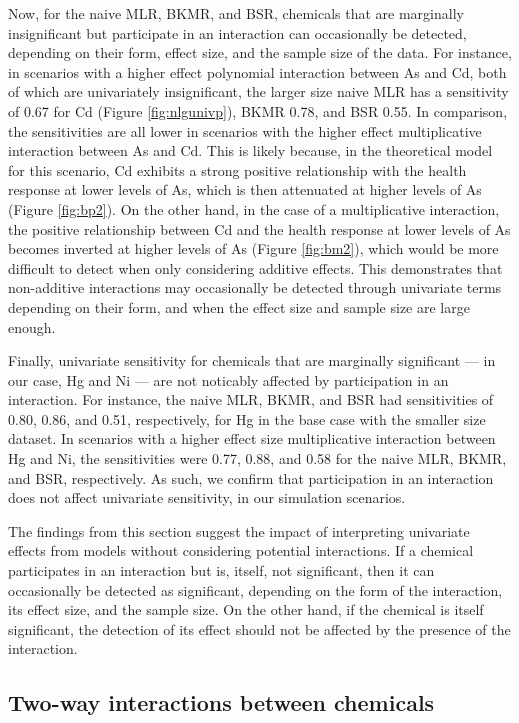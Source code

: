 \documentclass[12pt, twoside]{amherstthesis}
\begin{document}
Now, for the naive MLR, BKMR, and BSR, chemicals that are marginally insignificant but participate in an interaction can occasionally be detected, depending on their form, effect size, and the sample size of the data. For instance, in scenarios with a higher effect polynomial interaction between As and Cd, both of which are univariately insignificant, the larger size naive MLR has a sensitivity of 0.67 for Cd (Figure \ref{fig:nlgunivp}), BKMR 0.78, and BSR 0.55. In comparison, the sensitivities are all lower in scenarios with the higher effect multiplicative interaction between As and Cd. This is likely because, in the theoretical model for this scenario, Cd exhibits a strong positive relationship with the health response at lower levels of As, which is then attenuated at higher levels of As (Figure \ref{fig:bp2}). On the other hand, in the case of a multiplicative interaction, the positive relationship between Cd and the health response at lower levels of As becomes inverted at higher levels of As (Figure \ref{fig:bm2}), which would be more difficult to detect when only considering additive effects. This demonstrates that non-additive interactions may occasionally be detected through univariate terms depending on their form, and when the effect size and sample size are large enough.

Finally, univariate sensitivity for chemicals that are marginally significant --- in our case, Hg and Ni --- are not noticably affected by participation in an interaction. For instance, the naive MLR, BKMR, and BSR had sensitivities of 0.80, 0.86, and 0.51, respectively, for Hg in the base case with the smaller size dataset. In scenarios with a higher effect size multiplicative interaction between Hg and Ni, the sensitivities were 0.77, 0.88, and 0.58 for the naive MLR, BKMR, and BSR, respectively. As such, we confirm that participation in an interaction does not affect univariate sensitivity, in our simulation scenarios.

The findings from this section suggest the impact of interpreting univariate effects from models without considering potential interactions. If a chemical participates in an interaction but is, itself, not significant, then it can occasionally be detected as significant, depending on the form of the interaction, its effect size, and the sample size. On the other hand, if the chemical is itself significant, the detection of its effect should not be affected by the presence of the interaction.

\hypertarget{two-way-interactions-between-chemicals}{%
\subsection{Two-way interactions between chemicals}\label{two-way-interactions-between-chemicals}}
\end{document}

